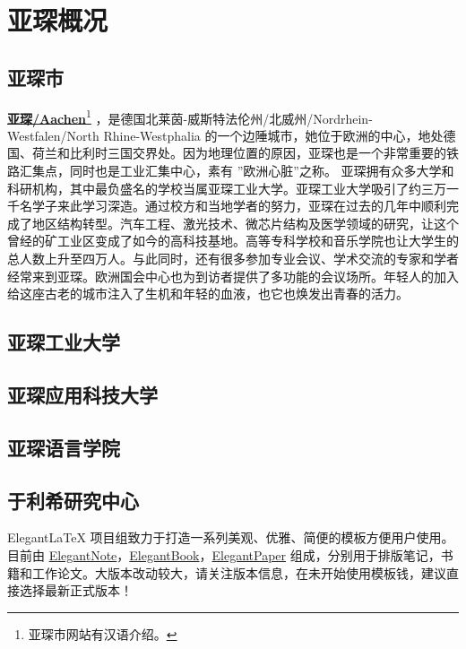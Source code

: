 
\chapter{亚琛概况}

\section{亚琛市}

\href{https://www.aachen.de/CHIN/kurzinfo.html}{\textbf{亚琛/Aachen}\footnote{亚琛市网站有汉语介绍。}} ，是德国北莱茵-威斯特法伦州/北威州/Nordrhein-Westfalen/North Rhine-Westphalia  的一个边陲城市，她位于欧洲的中心，地处德国、荷兰和比利时三国交界处。因为地理位置的原因，亚琛也是一个非常重要的铁路汇集点，同时也是工业汇集中心，素有 ”欧洲心脏”之称。
亚琛拥有众多大学和科研机构，其中最负盛名的学校当属亚琛工业大学。亚琛工业大学吸引了约三万一千名学子来此学习深造。通过校方和当地学者的努力，亚琛在过去的几年中顺利完成了地区结构转型。汽车工程、激光技术、微芯片结构及医学领域的研究，让这个曾经的矿工业区变成了如今的高科技基地。高等专科学校和音乐学院也让大学生的总人数上升至四万人。与此同时，还有很多参加专业会议、学术交流的专家和学者经常来到亚琛。欧洲国会中心也为到访者提供了多功能的会议场所。年轻人的加入给这座古老的城市注入了生机和年轻的血液，也它也焕发出青春的活力。

\section{亚琛工业大学}

\section{亚琛应用科技大学}

\section{亚琛语言学院}

\section{于利希研究中心}

Elegant\LaTeX{} 项目组致力于打造一系列美观、优雅、简便的模板方便用户使用。目前由 \href{https://github.com/ElegantLaTeX/ElegantNote}{ElegantNote}，\href{https://github.com/ElegantLaTeX/ElegantBook}{ElegantBook}，\href{https://github.com/ElegantLaTeX/ElegantPaper}{ElegantPaper} 组成，分别用于排版笔记，书籍和工作论文。大版本改动较大，请关注版本信息，在未开始使用模板钱，建议直接选择最新正式版本！

